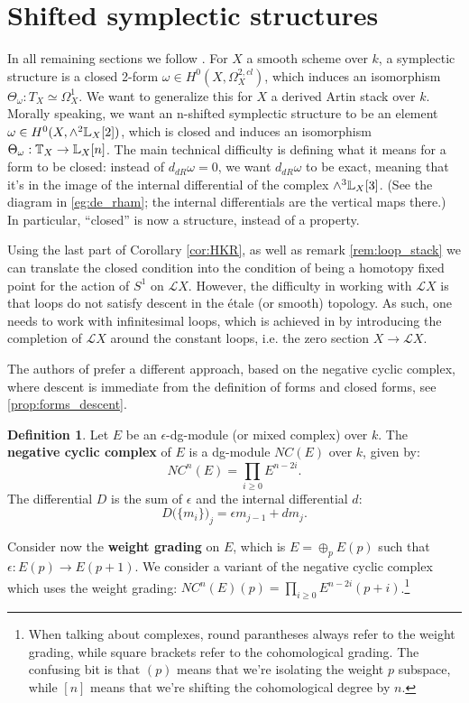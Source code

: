 \documentclass[10pt,a4paper,reqno,oneside]{book} %
\theoremstyle{plain}
\theoremstyle{definition}
\newtheorem{defin}[thm]{Definition}
\theoremstyle{remark}
\numberwithin{equation}{section}
\begin{document}
\section{Shifted symplectic structures}
In all remaining sections we follow \cite{PTVV}. For $X$ a smooth scheme over $k$, a symplectic structure is a closed
2-form
$\omega \in H^0(X,\Omega^{2,cl}_X)$, which induces an isomorphism $\Theta_\omega : T_X \simeq \Omega^1_X$. We want to
generalize this for $X$ a derived Artin stack over $k$. Morally speaking, we want an n-shifted symplectic structure
to be an element $\omega \in H^0(X,\wedge^2\mathbb L_X [2])$, which is closed and induces an isomorphism
$\Theta_\omega : \mathbb T_X \to \mathbb L_X[n]$. The main technical difficulty is defining what it means for a form to be closed:
instead of $d_{dR} \omega = 0$, we want $d_{dR} \omega$ to be exact, meaning that it's in the image of the internal
differential of the complex $\wedge^3\mathbb L_X[3]$. (See the diagram in \ref{eg:de_rham}; the internal differentials are the
vertical maps there.) In particular, ``closed'' is now a structure, instead of a property. 

Using the last part of Corollary \ref{cor:HKR}, as well as remark \ref{rem:loop_stack}
we can translate the closed condition into the condition of being a homotopy fixed point for the action of $S^1$ on $\mathscr{L}X$. 
However, the difficulty in working with $\mathscr{L}X$ is that loops do not satisfy descent in the \'etale (or smooth) topology.
As such, one needs to work with infinitesimal loops, which is achieved in \cite{BZN_loop} by introducing the completion
of $\mathscr{L}X$ around the constant loops, i.e. the zero section $X \to \mathscr{L}X$.

The authors of \cite{PTVV} prefer a different approach, based on the negative cyclic complex, where descent is immediate
from the definition of forms and closed forms, see \ref{prop:forms_descent}.

\begin{defin}
Let $E$ be an $\epsilon$-dg-module (or mixed complex) over $k$. The \textbf{negative cyclic complex} of $E$ is a dg-module $NC(E)$
over $k$, given by:
\[	NC^n(E) = \prod_{i\geq 0} E^{n-2i} .	\]
The differential $D$ is the sum of $\epsilon$ and the internal differential $d$:
\[	D\big(\{m_i\}\big)_j = \epsilon m_{j-1} + d m_j .	\]
\end{defin}

Consider now the \textbf{weight grading} on $E$, which is $E = \oplus_p E(p)$ such that $\epsilon : E(p) \to E(p+1)$.
We consider a variant of the negative cyclic complex which uses the weight grading: $NC^n(E)(p) = \prod_{i\geq 0}
E^{n-2i}(p+i)$.\footnote{When talking about complexes, round parantheses always refer to the weight grading,
while square brackets refer to the cohomological grading. The confusing bit is that $(p)$ means that we're isolating
the weight $p$ subspace, while $[n]$ means that we're shifting the cohomological degree by $n$.}
\end{document}
